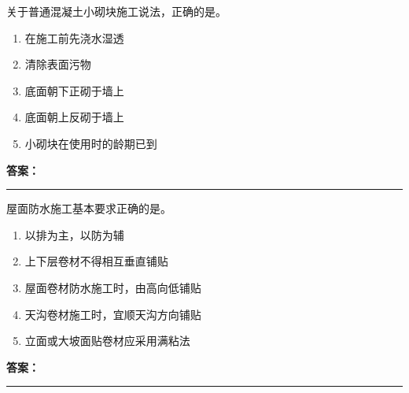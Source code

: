 \documentclass[UTF8,fontset=fandol,11pt]{ctexart}
\newcommand{\answerline}{\textcolor{answerred}{\rule{2.4cm}{0.7pt}}}
\begin{document}
\begin{quizbox}[title={乱序第 154 题｜第六章砌筑工程}]

关于普通混凝土小砌块施工说法，正确的是。\\

\begin{enumerate}[label=\Alph*.]

\item 在施工前先浇水湿透

\item 清除表面污物

\item 底面朝下正砌于墙上

\item 底面朝上反砌于墙上

\item 小砌块在使用时的龄期已到

\end{enumerate}

\textbf{\textcolor{answerred}{答案：}} \answerline

\end{quizbox}

\vspace{0.2em}

\begin{quizbox}[title={乱序第 155 题｜第九章防水工程}]

屋面防水施工基本要求正确的是。\\

\begin{enumerate}[label=\Alph*.]

\item 以排为主，以防为辅

\item 上下层卷材不得相互垂直铺贴

\item 屋面卷材防水施工时，由高向低铺贴

\item 天沟卷材施工时，宜顺天沟方向铺贴

\item 立面或大坡面贴卷材应采用满粘法

\end{enumerate}

\textbf{\textcolor{answerred}{答案：}} \answerline

\end{quizbox}

\vspace{0.2em}
\end{document}
